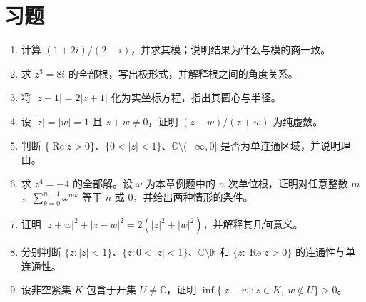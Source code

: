 \section{习题}
\label{sec:ca-plane-ex}
\begin{enumerate}
 \item 计算 $(1+2i)/(2-i)$，并求其模；说明结果为什么与模的商一致。
 \item 求 $z^3=8i$ 的全部根，写出极形式，并解释根之间的角度关系。
 \item 将 $|z-1|=2|z+1|$ 化为实坐标方程，指出其圆心与半径。
 \item 设 $|z|=|w|=1$ 且 $z+w\ne0$，证明 $(z-w)/(z+w)$ 为纯虚数。
 \item 判断 $\{\operatorname{Re}z>0\}$、$\{0<|z|<1\}$、$\mathbb C\setminus(-\infty,0]$ 是否为单连通区域，并说明理由。

  \item\label{ex:ca-roots-sum} 求 $z^4=-4$ 的全部解。设 $\omega$ 为本章例题中的 $n$ 次单位根，证明对任意整数 $m$，$\sum_{k=0}^{n-1}\omega^{mk}$ 等于 $n$ 或 $0$，并给出两种情形的条件。
  \item\label{ex:ca-parallelogram} 证明 $|z+w|^2+|z-w|^2=2(|z|^2+|w|^2)$，并解释其几何意义。
  \item\label{ex:ca-domains} 分别判断 $\{z:|z|<1\}$、$\{z:0<|z|<1\}$、$\mathbb{C}\setminus\mathbb{R}$ 和 $\{z:\operatorname{Re}z>0\}$ 的连通性与单连通性。
  \item\label{ex:ca-separation} 设非空紧集 $K$ 包含于开集 $U\ne\mathbb{C}$，证明 $\inf\{|z-w|:z\in K,\ w\notin U\}>0$。
\end{enumerate}

